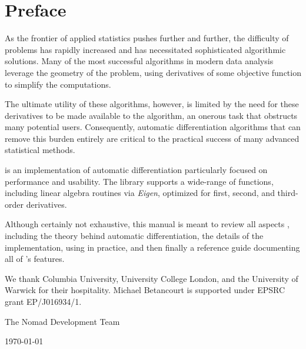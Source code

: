 \chapter*{Preface}

As the frontier of applied statistics pushes further and further, the
difficulty of problems has rapidly increased and has necessitated
sophisticated algorithmic solutions.  Many of the most successful
algorithms in modern data analysis leverage the geometry of the
problem, using derivatives of some objective function to simplify
the computations.

The ultimate utility of these algorithms, however, is limited by the
need for these derivatives to be made available to the algorithm,
an onerous task that obstructs many potential users.  Consequently,
automatic differentiation algorithms that can remove this burden
entirely are critical to the practical success of many advanced
statistical methods.

\nomad is an implementation of automatic differentiation particularly 
focused on performance and usability.  The library supports a wide-range 
of functions, including linear algebra routines via \textit{Eigen}, optimized
for first, second, and third-order derivatives.

Although certainly not exhaustive, this manual is meant to review
all aspects \nomad, including the theory behind automatic differentiation,
the details of the \nomad implementation, using \nomad in practice,
and then finally a reference guide documenting all of \nomad's features.

We thank Columbia University, University College London, and the University
of Warwick for their hospitality.  Michael Betancourt is supported under EPSRC 
grant EP/J016934/1.

\vspace{5mm}
\hfill The Nomad Development Team

\hfill \today